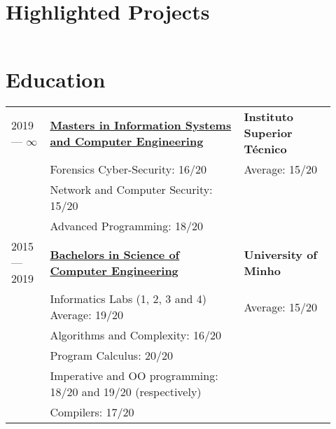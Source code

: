 \documentclass{article}
\newcommand{\ul}[1]{\underline{#1}}
\begin{document}
\section{Highlighted Projects}

\begin{tabular}{p{0.11\linewidth}p{0.73\linewidth}l}
\end{tabular}

\section{Education}

\begin{tabular}{p{0.11\linewidth}p{0.55\linewidth}p{0.26\linewidth}}

    2019 --- $\infty$ &
        \ul{\textbf{Masters in Information Systems and Computer Engineering}}
    &
        \textbf{Instituto Superior Técnico}
    \\
    & Forensics Cyber-Security: 16/20 & Average: 15/20 \\
    & Network and Computer Security: 15/20 &\\
    & Advanced Programming: 18/20 &\\

    2015 --- 2019
    &
        \ul{\textbf{Bachelors in Science of Computer Engineering}}
    &
        \textbf{University of Minho}
    \\
    & Informatics Labs (1, 2, 3 and 4) Average: 19/20 & Average: 15/20 \\
    & Algorithms and Complexity: 16/20 & \\
    & Program Calculus: 20/20 & \\
    & Imperative and OO programming: 18/20 and 19/20 (respectively) &\\
    & Compilers: 17/20 &\\

\end{tabular}


\end{document}
